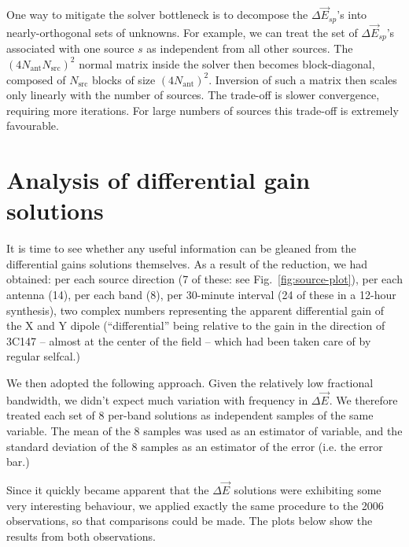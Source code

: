 \documentclass[]{aa}
\newcommand{\jones}[2]{\vec {#1}_{#2}}
\begin{document}
One way to mitigate the solver bottleneck is to decompose the $\Delta\jones{E}{sp}$'s into nearly-orthogonal sets of unknowns. For example, we can treat the set of $\Delta\jones{E}{sp}$'s associated with one source $s$ as independent from all other sources. The $(4N_\mathrm{ant}N_\mathrm{src})^2$ normal matrix inside the solver then becomes block-diagonal, composed of $N_\mathrm{src}$ blocks of size $(4N_\mathrm{ant})^2$. Inversion of such a matrix then scales only linearly with the number of sources. The trade-off is slower convergence, requiring more iterations. For large numbers of sources this trade-off is extremely favourable.

\section{Analysis of differential gain solutions\label{sec:de-analysis}}

It is time to see whether any useful information can be gleaned from the differential gains solutions themselves. As a result of the reduction, we had obtained: per each source direction (7 of these: see Fig.~\ref{fig:source-plot}), per each antenna (14), per each band (8), per 30-minute interval (24 of these in a 12-hour synthesis), two complex numbers representing the apparent differential gain of the X and Y dipole (``differential'' being relative to the gain in the direction of 3C147 -- almost at the center of the field -- which had been taken care of by regular selfcal.)

We then adopted the following approach. Given the relatively low fractional bandwidth, we didn't expect much variation with frequency in $\Delta\jones{E}{}$. We therefore treated each set of 8 per-band solutions as independent samples of the same variable. The mean of the 8 samples was used as an estimator of variable, and the standard deviation of the 8 samples as an estimator of the error (i.e. the error bar.)

Since it quickly became apparent that the $\Delta\jones{E}{}$ solutions were exhibiting some very interesting behaviour, we applied exactly the same procedure to the 2006 observations, so that comparisons could be made. The plots below show the results from both observations. 
\end{document}

